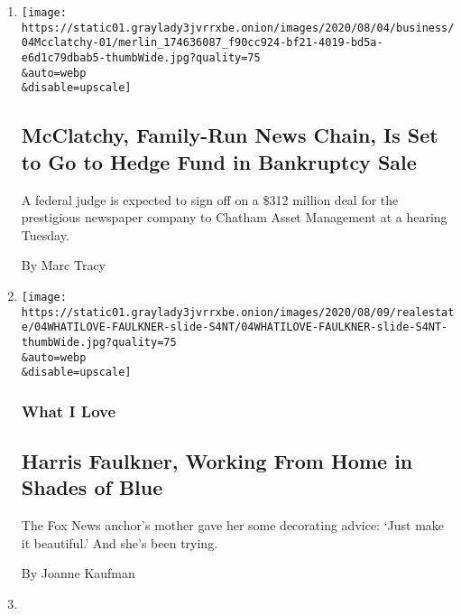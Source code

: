 \begin{enumerate}
\def\labelenumi{\arabic{enumi}.}
\item
  \href{/2020/08/04/business/media/mcclatchy-newspapers-bankrutpcy-chatham.html}{}

  \texttt{[image: https://static01.graylady3jvrrxbe.onion/images/2020/08/04/business/04Mcclatchy-01/merlin\_174636087\_f90cc924-bf21-4019-bd5a-e6d1c79dbab5-thumbWide.jpg?quality=75\\\&auto=webp\\\&disable=upscale]}

  \hypertarget{mcclatchy-family-run-news-chain-is-set-to-go-to-hedge-fund-in-bankruptcy-sale}{%
  \subsection{McClatchy, Family-Run News Chain, Is Set to Go to Hedge
  Fund in Bankruptcy
  Sale}\label{mcclatchy-family-run-news-chain-is-set-to-go-to-hedge-fund-in-bankruptcy-sale}}

  A federal judge is expected to sign off on a \$312 million deal for
  the prestigious newspaper company to Chatham Asset Management at a
  hearing Tuesday.

  By Marc Tracy
\item
  \href{/2020/08/04/realestate/harris-faulkner-home-fox-news.html}{}

  \texttt{[image: https://static01.graylady3jvrrxbe.onion/images/2020/08/09/realestate/04WHATILOVE-FAULKNER-slide-S4NT/04WHATILOVE-FAULKNER-slide-S4NT-thumbWide.jpg?quality=75\\\&auto=webp\\\&disable=upscale]}

  \hypertarget{what-i-love}{%
  \subsubsection{What I Love}\label{what-i-love}}

  \hypertarget{harris-faulkner-working-from-home-in-shades-of-blue}{%
  \subsection{Harris Faulkner, Working From Home in Shades of
  Blue}\label{harris-faulkner-working-from-home-in-shades-of-blue}}

  The Fox News anchor's mother gave her some decorating advice: `Just
  make it beautiful.' And she's been trying.

  By Joanne Kaufman
\item
  \href{/2020/08/03/technology/ftc-twitter-privacy-violations.html}{}


\end{enumerate}

